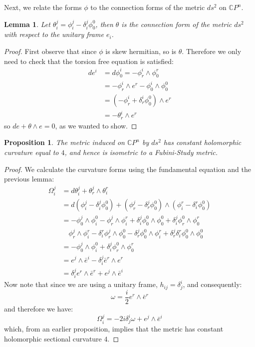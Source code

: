\documentclass[11pt]{amsart}
\newtheorem{lem}[subsection]{Lemma}
\newtheorem{prop}[subsection]{Proposition}
\theoremstyle{definition}
\def \CP{ \mathbb{C}P }
\begin{document}
Next, we relate the forms $\phi$ to the connection forms of the metric $ds^2$ on $\CP^n$.
%
\begin{lem}  Let $ \theta^j_i = \phi^j_i - \delta^j_i \phi^0_0 $, then $\theta$ is the connection form of the metric $ds^2$ with respect to the unitary frame $e_i$.
\end{lem}
%
\begin{proof}  First observe that since $\phi$ is skew hermitian, so is $\theta$.  Therefore we only need to check that the torsion free equation is satisfied:
%
\begin{align*}
d e^i &= d \phi^i_0 = - \phi^i_r \wedge \phi^r_0 \\
&= - \phi^i_r \wedge e^r - \phi^i_0 \wedge \phi^0_0 \\
&= ( - \phi^i_r + \delta^i_r \phi^0_0 ) \wedge e^r \\
&= - \theta^i_r \wedge e^r
\end{align*} 
%
so $d e + \theta \wedge e = 0$, as we wanted to show.
%
\end{proof}
%
\begin{prop} The metric induced on $\CP^n$ by $ds^2$ has constant holomorphic curvature equal to $4$, and hence is isometric to a Fubini-Study metric.
\end{prop}
%
\begin{proof}
%
We calculate the curvature forms using the fundamental equation and the previous lemma:
%
\begin{align*}
\Omega^j_i &= d \theta^j_i + \theta^j_r \wedge \theta^r_i \\
&= d( \phi^j_i - \delta^j_i \phi^0_0 ) + ( \phi^j_r - \delta^j_r \phi^0_0 ) \wedge ( \phi^r_i - \delta^r_i \phi^0_0 ) \\
%
&= - \phi^j_0 \wedge \phi^0_i - \phi^j_r \wedge \phi^r_i + \delta^j_i \phi^0_0 \wedge \phi^0_0 + \delta^j_i \phi^0_r \wedge \phi^r_0 \\
& \quad \phi^j_r \wedge \phi^r_i - \delta^r_i \phi^j_r \wedge \phi^0_0 - \delta^j_r \phi^0_0 \wedge \phi^r_i + \delta^j_r \delta^r_i \phi^0_0 \wedge \phi^0_0 \\
%
&= - \phi^j_0 \wedge \phi^0_i + \delta^j_i \phi^0_r \wedge \phi^r_0 \\
&= e^j \wedge \bar{e}^i - \delta^j_i \bar{e}^r \wedge e^r \\
&= \delta^j_i e^r \wedge \bar{e}^r + e^j \wedge \bar{e}^i 
\end{align*}
%
Now note that since we are using a unitary frame, $h_{ij} = \delta^i_j$, and consequently:
%
$$ \omega = \frac{i}{2} e^r \wedge \bar{e}^r $$
%
and therefore we have:
%
$$ \Omega^j_i = - 2 i \delta^i_j \omega + e^j \wedge \bar{e}^i $$
%
which, from an earlier proposition, implies that the metric has constant holomorphic sectional curvature $4$.
\end{proof}
\end{document}
